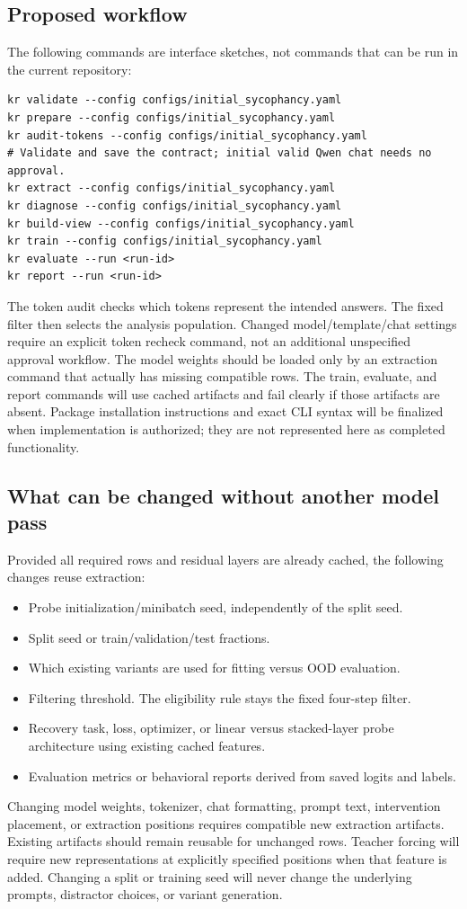 \documentclass[11pt]{article}
\begin{document}
\subsection*{Proposed workflow}

The following commands are interface sketches, not commands that can be run in the current repository:
\begin{verbatim}
kr validate --config configs/initial_sycophancy.yaml
kr prepare --config configs/initial_sycophancy.yaml
kr audit-tokens --config configs/initial_sycophancy.yaml
# Validate and save the contract; initial valid Qwen chat needs no approval.
kr extract --config configs/initial_sycophancy.yaml
kr diagnose --config configs/initial_sycophancy.yaml
kr build-view --config configs/initial_sycophancy.yaml
kr train --config configs/initial_sycophancy.yaml
kr evaluate --run <run-id>
kr report --run <run-id>
\end{verbatim}
The token audit checks which tokens represent the intended answers. The fixed filter then selects the analysis population.
Changed model/template/chat settings require an explicit token recheck command, not an additional unspecified approval workflow.
The model weights should be loaded only by an extraction command that actually has missing compatible rows.
The train, evaluate, and report commands will use cached artifacts and fail clearly if those artifacts are absent.
Package installation instructions and exact CLI syntax will be finalized when implementation is authorized; they are not represented here as completed functionality.

\subsection*{What can be changed without another model pass}

Provided all required rows and residual layers are already cached, the following changes reuse extraction:
\begin{itemize}
\item Probe initialization/minibatch seed, independently of the split seed.
\item Split seed or train/validation/test fractions.
\item Which existing variants are used for fitting versus OOD evaluation.
\item Filtering threshold. The eligibility rule stays the fixed four-step filter.
\item Recovery task, loss, optimizer, or linear versus stacked-layer probe architecture using existing cached features.
\item Evaluation metrics or behavioral reports derived from saved logits and labels.
\end{itemize}
Changing model weights, tokenizer, chat formatting, prompt text, intervention placement, or extraction positions requires compatible new extraction artifacts.
Existing artifacts should remain reusable for unchanged rows.
Teacher forcing will require new representations at explicitly specified positions when that feature is added.
Changing a split or training seed will never change the underlying prompts, distractor choices, or variant generation.
\end{document}
